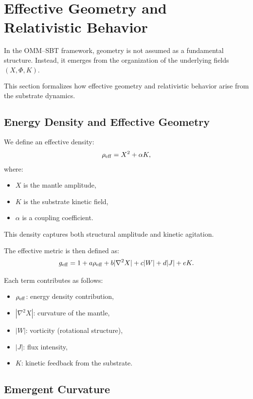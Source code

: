\documentclass[11pt]{article}
\begin{document}
\section{Effective Geometry and Relativistic Behavior}

In the OMM--SBT framework, geometry is not assumed as a fundamental structure. Instead, it emerges from the organization of the underlying fields $(X, \Phi, K)$.

This section formalizes how effective geometry and relativistic behavior arise from the substrate dynamics.

\subsection{Energy Density and Effective Geometry}

We define an effective density:
\begin{equation}
\rho_{\rm eff} = X^2 + \alpha K,
\end{equation}
where:
\begin{itemize}
\item $X$ is the mantle amplitude,
\item $K$ is the substrate kinetic field,
\item $\alpha$ is a coupling coefficient.
\end{itemize}

This density captures both structural amplitude and kinetic agitation.

The effective metric is then defined as:
\begin{equation}
g_{\rm eff} = 1 + a \rho_{\rm eff} + b |\nabla^2 X| + c |W| + d |J| + e K.
\end{equation}

Each term contributes as follows:
\begin{itemize}
\item $\rho_{\rm eff}$: energy density contribution,
\item $|\nabla^2 X|$: curvature of the mantle,
\item $|W|$: vorticity (rotational structure),
\item $|J|$: flux intensity,
\item $K$: kinetic feedback from the substrate.
\end{itemize}

\subsection{Emergent Curvature}
\end{document}

